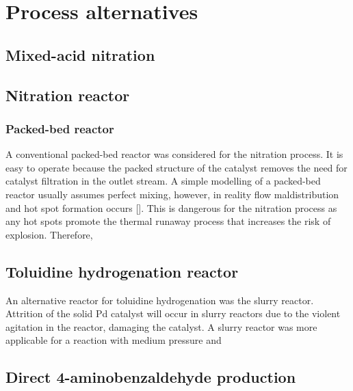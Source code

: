 \section{Process alternatives}
\label{app:alternatives}

\subsection{Mixed-acid nitration}
\label{mixed}

\subsection{Nitration reactor}
\label{nitrationreactor}
\subsubsection{Packed-bed reactor}
A conventional packed-bed reactor was considered for the nitration process. It is easy to operate because the packed structure of the catalyst removes the need for catalyst filtration in the outlet stream. A simple modelling of a packed-bed reactor usually assumes perfect mixing, however, in reality flow maldistribution and hot spot formation occurs []. This is dangerous for the nitration process as any hot spots promote the thermal runaway process that increases the risk of explosion. Therefore, 

\subsection{Toluidine hydrogenation reactor}
\label{toluidine}
An alternative reactor for toluidine hydrogenation was the slurry reactor. Attrition of the solid Pd catalyst will occur in slurry reactors due to the violent agitation in the reactor, damaging the catalyst. A slurry reactor was more applicable for a reaction with medium pressure and 


\subsection{Direct 4-aminobenzaldehyde production}
\label{direct}